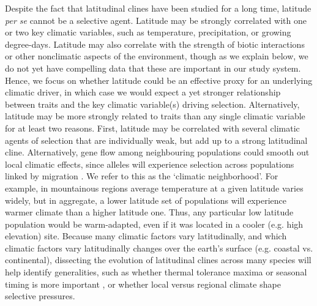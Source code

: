 \documentclass[11pt, oneside]{article}
\begin{document}
Despite the fact that latitudinal clines have been studied for a long time, latitude \textit{per se} cannot be a selective agent. Latitude may be strongly correlated with one or two key climatic variables, such as temperature, precipitation, or growing degree-days. Latitude may also correlate with the strength of biotic interactions \citep{Schemske_etal_2009} or other nonclimatic aspects of the environment, though as we explain below, we do not yet have compelling data that these are important in our study system. Hence, we focus on whether latitude could be an effective proxy for an underlying climatic driver, in which case we would expect a yet stronger relationship between traits and the key climatic variable(s) driving selection. Alternatively, latitude may be more strongly related to traits than any single climatic variable for at least two reasons. First, latitude may be correlated with several climatic agents of selection that are individually weak, but add up to a strong latitudinal cline. Alternatively, gene flow among neighbouring populations could smooth out local climatic effects, since alleles will experience selection across populations linked by migration \citep{Slatkin_1978, Paul_etal_2011, Hadfield_2016}. We refer to this as the `climatic neighborhood'. For example, in mountainous regions average temperature at a given latitude varies widely, but in aggregate, a lower latitude set of populations will experience warmer climate than a higher latitude one. Thus, any particular low latitude population would be warm-adapted, even if it was located in a cooler (e.g. high elevation) site. Because many climatic factors vary latitudinally, and which climatic factors vary latitudinally changes over the earth's surface (e.g. coastal vs. continental), dissecting the evolution of latitudinal clines across many species will help identify generalities, such as whether thermal tolerance maxima or seasonal timing is more important \citep{Bradshaw_Holzapfel_2008}, or whether local versus regional climate shape selective pressures.
\end{document}
